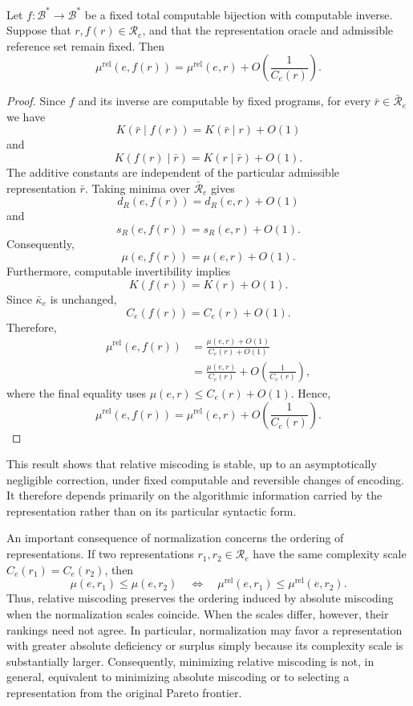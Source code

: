 \begin{proposition}
\label{prop:rel_miscoding_recoding}
Let $f:\mathcal B^\ast\to\mathcal B^\ast$ be a fixed total computable bijection with computable inverse. Suppose that $r,f(r)\in\mathcal R_e$, and that the representation oracle and admissible reference set remain fixed. Then
\[
\mu^{\mathrm{rel}}(e,f(r)) = \mu^{\mathrm{rel}}(e,r) + O\left(\frac{1}{C_e(r)}\right).
\]
\end{proposition}
\begin{proof}
Since $f$ and its inverse are computable by fixed programs, for every $\bar r\in\bar{\mathcal R}_e$ we have
\[
K(\bar r\mid f(r)) = K(\bar r\mid r)+O(1)
\]
and
\[
K(f(r)\mid\bar r) = K(r\mid\bar r)+O(1).
\]
The additive constants are independent of the particular admissible representation $\bar r$. Taking minima over $\bar{\mathcal R}_e$ gives
\[
d_R(e,f(r))=d_R(e,r)+O(1)
\]
and
\[
s_R(e,f(r))=s_R(e,r)+O(1).
\]
Consequently,
\[
\mu(e,f(r))=\mu(e,r)+O(1).
\]
Furthermore, computable invertibility implies
\[
K(f(r))=K(r)+O(1).
\]
Since $\bar\kappa_e$ is unchanged,
\[
C_e(f(r))=C_e(r)+O(1).
\]
Therefore,
\[
\begin{aligned}
\mu^{\mathrm{rel}}(e,f(r))
& = \frac{\mu(e,r)+O(1)}{C_e(r)+O(1)}\\
& = \frac{\mu(e,r)}{C_e(r)} + O\left(\frac{1}{C_e(r)}\right),
\end{aligned}
\]
where the final equality uses
$\mu(e,r)\le C_e(r)+O(1)$. Hence,
\[
\mu^{\mathrm{rel}}(e,f(r)) = \mu^{\mathrm{rel}}(e,r) + O\left(\frac{1}{C_e(r)}\right).
\]
\end{proof}

This result shows that relative miscoding is stable, up to an asymptotically negligible correction, under fixed computable and reversible changes of encoding. It therefore depends primarily on the algorithmic information carried by the representation rather than on its particular syntactic form.

An important consequence of normalization concerns the ordering of representations. If two representations $r_1,r_2\in\mathcal R_e$ have the same complexity scale $C_e(r_1)=C_e(r_2)$, then
\[
\mu(e,r_1)\le\mu(e,r_2) \quad\Longleftrightarrow\quad \mu^{\mathrm{rel}}(e,r_1) \le \mu^{\mathrm{rel}}(e,r_2).
\]
Thus, relative miscoding preserves the ordering induced by absolute miscoding when the normalization scales coincide. When the scales differ, however, their rankings need not agree. In particular, normalization may favor a representation with greater absolute deficiency or surplus simply because its complexity scale is substantially larger. Consequently, minimizing relative miscoding is not, in general, equivalent to minimizing absolute miscoding or to selecting a representation from the original Pareto frontier.

